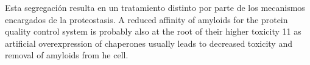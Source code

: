 Esta segregación resulta en un tratamiento distinto por parte de los mecanismos encargados de la proteostasis.
A reduced affinity of amyloids for the protein quality control system is probably also at the root of their higher toxicity 11 as artificial overexpression of chaperones
usually leads to decreased toxicity and removal of amyloids from he cell.



















































































